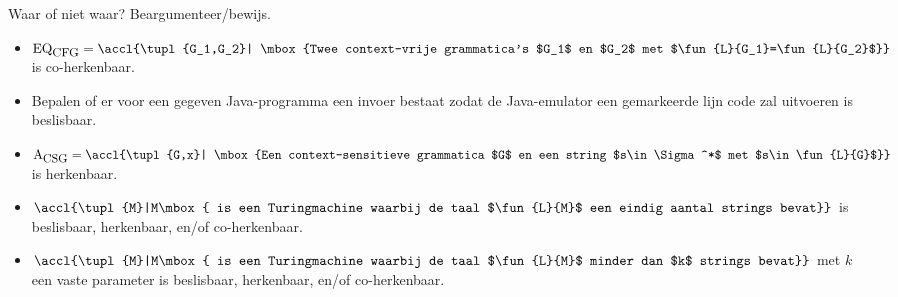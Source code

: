 \documentclass[fleqn]{article}
\begin{document}
\begin{question}
Waar of niet waar? Beargumenteer/bewijs.
\begin{itemize}
 \item $\mbox{EQ}_{\mbox{\small{CFG}}}=\accl{\tupl{G_1,G_2}| \mbox{Twee context-vrije grammatica's $G_1$ en $G_2$ met $\fun{L}{G_1}=\fun{L}{G_2}$}}$ is co-herkenbaar.
 \item Bepalen of er voor een gegeven Java-programma een invoer bestaat zodat de Java-emulator een gemarkeerde lijn code zal uitvoeren is beslisbaar.
 \item $\mbox{A}_{\mbox{\small{CSG}}}=\accl{\tupl{G,x}| \mbox{Een context-sensitieve grammatica $G$ en een string $s\in\Sigma^*$ met $s\in\fun{L}{G}$}}$ is herkenbaar.
 \item $\accl{\tupl{M}|M\mbox{ is een Turingmachine waarbij de taal $\fun{L}{M}$ een eindig aantal strings bevat}}$ is beslisbaar, herkenbaar, en/of co-herkenbaar.
 \item $\accl{\tupl{M}|M\mbox{ is een Turingmachine waarbij de taal $\fun{L}{M}$ minder dan $k$ strings bevat}}$ met $k$ een vaste parameter is beslisbaar, herkenbaar, en/of co-herkenbaar.
\end{itemize}
\end{question}
\end{document}
